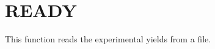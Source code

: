 \section{READY}
\label{sect:ready}

\noindent This function reads the experimental yields from a file.
